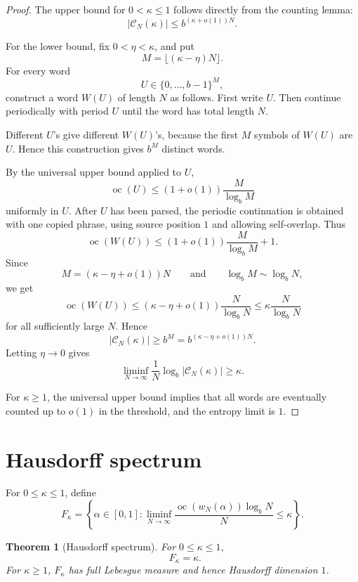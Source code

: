 \documentclass[11pt]{amsart}
\newtheorem{theorem}{Theorem}[section]
\DeclareMathOperator{\oc}{oc}
\DeclareMathOperator{\dimH}{dim_H}
\begin{document}
\begin{proof}
The upper bound for $0<\kappa\leq1$ follows directly from the counting lemma:
\[
|\mathcal C_N(\kappa)|
\leq
b^{(\kappa+o(1))N}.
\]

For the lower bound, fix $0<\eta<\kappa$, and put
\[
M=\lfloor(\kappa-\eta)N\rfloor.
\]
For every word
\[
U\in\{0,\ldots,b-1\}^M,
\]
construct a word $W(U)$ of length $N$ as follows. First write $U$. Then continue periodically with period $U$ until the word has total length $N$.

Different $U$'s give different $W(U)$'s, because the first $M$ symbols of $W(U)$ are $U$. Hence this construction gives $b^M$ distinct words.

By the universal upper bound applied to $U$,
\[
\oc(U)\leq
(1+o(1))\frac{M}{\log_b M}
\]
uniformly in $U$. After $U$ has been parsed, the periodic continuation is obtained with one copied phrase, using source position $1$ and allowing self-overlap. Thus
\[
\oc(W(U))
\leq
(1+o(1))\frac{M}{\log_b M}+1.
\]
Since
\[
M=(\kappa-\eta+o(1))N
\qquad\text{and}\qquad
\log_b M\sim\log_b N,
\]
we get
\[
\oc(W(U))
\leq
(\kappa-\eta+o(1))\frac{N}{\log_b N}
\leq
\kappa\frac{N}{\log_b N}
\]
for all sufficiently large $N$. Hence
\[
|\mathcal C_N(\kappa)|
\geq
b^M
=
b^{(\kappa-\eta+o(1))N}.
\]
Letting $\eta\to0$ gives
\[
\liminf_{N\to\infty}
\frac1N\log_b|\mathcal C_N(\kappa)|
\geq \kappa.
\]

For $\kappa\geq1$, the universal upper bound implies that all words are eventually counted up to $o(1)$ in the threshold, and the entropy limit is $1$.
\end{proof}

\section{Hausdorff spectrum}

For $0\leq\kappa\leq1$, define
\[
F_\kappa
=
\left\{
\alpha\in[0,1]:
\liminf_{N\to\infty}
\frac{\oc(w_N(\alpha))\log_b N}{N}
\leq \kappa
\right\}.
\]

\begin{theorem}[Hausdorff spectrum]
For $0\leq\kappa\leq1$,
\[
\dimH F_\kappa=\kappa.
\]
For $\kappa\geq1$, $F_\kappa$ has full Lebesgue measure and hence Hausdorff dimension $1$.
\end{theorem}
\end{document}
